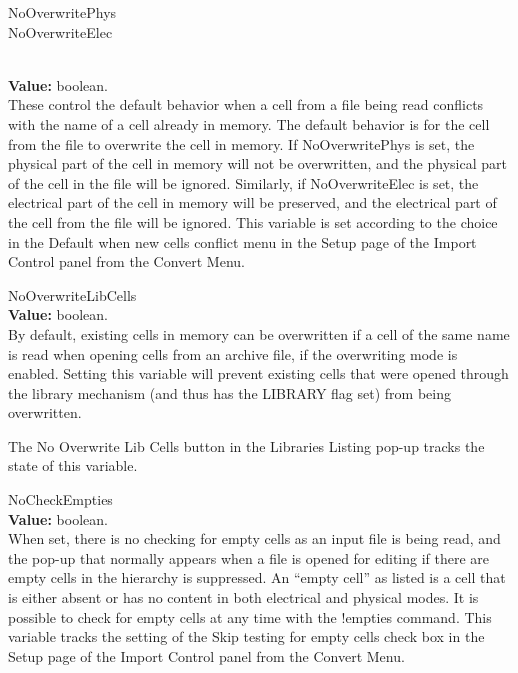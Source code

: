 \begin{description}
\item\parbox[b]{4in}{
{\et NoOverwritePhys}\\
{\et NoOverwriteElec}}\\
{\bf Value:} boolean.\\
These control the default behavior when a cell from a file being read
conflicts with the name of a cell already in memory.  The default
behavior is for the cell from the file to overwrite the cell in
memory.  If {\et NoOverwritePhys} is set, the physical part of the
cell in memory will not be overwritten, and the physical part of the
cell in the file will be ignored.  Similarly, if {\et NoOverwriteElec}
is set, the electrical part of the cell in memory will be preserved,
and the electrical part of the cell from the file will be ignored. 
This variable is set according to the choice in the {\cb Default when
new cells conflict} menu in the {\cb Setup} page of the {\cb Import
Control} panel from the {\cb Convert Menu}.

\item{\et NoOverwriteLibCells}\\
{\bf Value:} boolean.\\
By default, existing cells in memory can be overwritten if a cell of
the same name is read when opening cells from an archive file, if the
overwriting mode is enabled.  Setting this variable will prevent
existing cells that were opened through the library mechanism (and
thus has the LIBRARY flag set) from being overwritten.

The {\cb No Overwrite Lib Cells} button in the {\cb Libraries Listing}
pop-up tracks the state of this variable.

\item{\et NoCheckEmpties}\\
{\bf Value:} boolean.\\
When set, there is no checking for empty cells as an input file is
being read, and the pop-up that normally appears when a file is opened
for editing if there are empty cells in the hierarchy is suppressed. 
An ``empty cell'' as listed is a cell that is either absent or has no
content in both electrical and physical modes.  It is possible to
check for empty cells at any time with the {\cb !empties} command. 
This variable tracks the setting of the {\cb Skip testing for empty
cells} check box in the {\cb Setup} page of the {\cb Import Control}
panel from the {\cb Convert Menu}.


\end{description}
